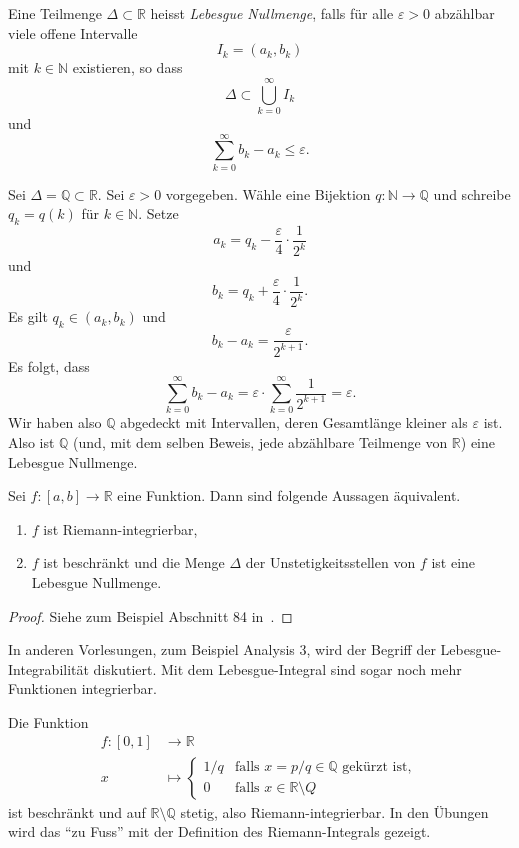 \documentclass[../main.tex]{subfiles}
\begin{document}
\begin{definition}
  Eine Teilmenge $\Delta \subset \mathbb{R}$ 
  heisst \emph{Lebesgue Nullmenge},
  falls für alle $\varepsilon > 0$ abzählbar viele
  offene Intervalle
  \[
    I_k = (a_k, b_k)
  \]
  mit $k \in \mathbb{N}$
  existieren, so dass 
  \[
    \Delta \subset \bigcup_{k=0}^{\infty} I_k
  \]
  und
  \[
    \sum_{k=0}^{\infty} b_k - a_k \leq \varepsilon.
  \]
\end{definition}

\begin{example}
  Sei $\Delta = \mathbb{Q} \subset \mathbb{R}$.
  Sei $\varepsilon > 0$ vorgegeben.
  Wähle eine Bijektion $q \colon\mathbb{N} \to \mathbb{Q}$ 
  und schreibe $q_k = q(k)$ für $k \in \mathbb{N}$.
  Setze
  \[
    a_k = q_k - \frac{\varepsilon}{4} \cdot \frac{1}{2^k}
  \]
  und
  \[
    b_k = q_k + \frac{\varepsilon}{4} \cdot \frac{1}{2^k}.
  \]
  Es gilt $q_k \in (a_k, b_k)$ und  
  \[
    b_k - a_k = \frac{\varepsilon}{2^{k+1}}.
  \]
  Es folgt, dass
  \[
    \sum_{k=0}^{\infty} b_k - a_k = \varepsilon \cdot
    \sum_{k=0}^{\infty} \frac{1}{2^{k+1}} = \varepsilon.
  \]
  Wir haben also $\mathbb{Q}$ abgedeckt mit Intervallen,
  deren Gesamtlänge kleiner als $\varepsilon$ ist.
  Also ist $\mathbb{Q}$ (und, mit dem selben Beweis,
  jede abzählbare Teilmenge von $\mathbb{R}$)
  eine Lebesgue Nullmenge.
\end{example}

\begin{theorem}[Lebesgue 1901]
  Sei $f \colon [a, b] \to \mathbb{R}$ eine Funktion.
  Dann sind folgende Aussagen äquivalent.
  \begin{enumerate}[\normalfont(i)]
    \item $f$ ist  Riemann-integrierbar,
    \item $f$ ist beschränkt und die Menge
      $\Delta$ der Unstetigkeitsstellen von $f$ ist
      eine Lebesgue Nullmenge.
  \end{enumerate}
\end{theorem}

\begin{proof}
  Siehe zum Beispiel Abschnitt 84 in~\cite{heuser}.
\end{proof}

In anderen Vorlesungen, zum Beispiel Analysis 3, wird
der Begriff der Lebesgue-Integrabilität diskutiert.
Mit dem Lebesgue-Integral sind sogar noch mehr Funktionen
integrierbar.

\begin{example}
  Die Funktion
  \begin{align*}
    f \colon [0, 1] & \to \mathbb{R} \\
    x & \mapsto 
    \begin{cases}
      1/q & \text{falls $x = p/q \in \mathbb{Q}$ gekürzt ist},\\
      0 & \text{falls $x \in \mathbb{R} \setminus Q$}
    \end{cases}
  \end{align*}
  ist beschränkt
  und auf $\mathbb{R} \setminus \mathbb{Q}$ stetig,
  also Riemann-integrierbar. In den Übungen wird das
  ``zu Fuss'' mit der Definition des Riemann-Integrals
  gezeigt.
\end{example}
\end{document}

